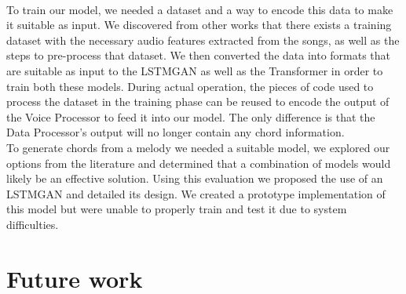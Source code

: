 \\
To train our model, we needed a dataset and a way to encode this data to make it suitable as input. 
We discovered from other works that there exists a training dataset with the necessary audio features extracted from the songs, as well as the steps to pre-process that dataset. 
We then converted the data into formats that are suitable as input to the LSTMGAN as well as the Transformer in order to train both these models. 
During actual operation, the pieces of code used to process the dataset in the training phase can be reused to encode the output of the Voice Processor to feed it into our model. 
The only difference is that the Data Processor's output will no longer contain any chord information.
\\
To generate chords from a melody we needed a suitable model, we explored our options from the literature and determined that a combination of models would likely be an effective solution.
Using this evaluation we proposed the use of an LSTMGAN and detailed its design.
We created a prototype implementation of this model but were unable to properly train and test it due to system difficulties.

\section{Future work}

